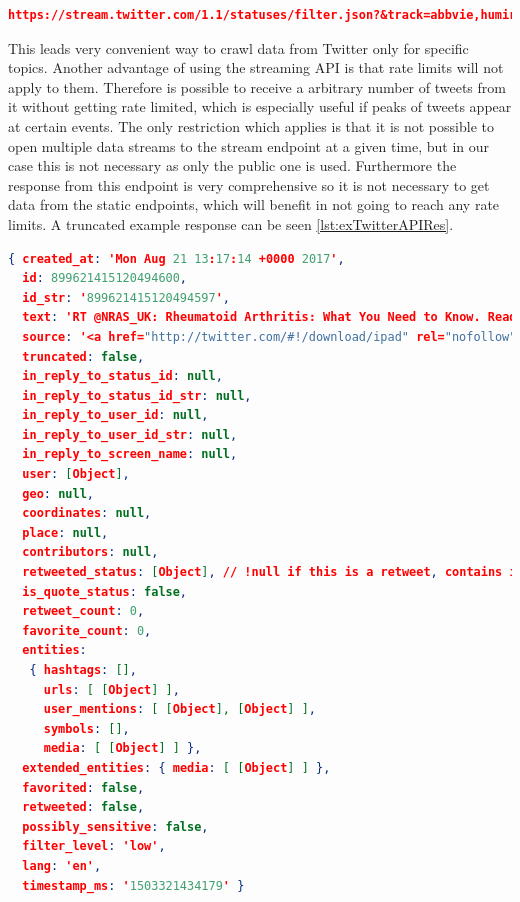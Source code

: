 \documentclass[11pt,titlepage,oneside,openany]{book}
\begin{document}
\begin{lstlisting}[caption={Twitter streaming endpoint},captionpos=b,language=json,label={lst:twitterStreaming}]
https://stream.twitter.com/1.1/statuses/filter.json?&track=abbvie,humira,adalimumab...
\end{lstlisting}

This leads very convenient way to crawl data from Twitter only for specific topics. Another advantage of using the streaming API is that rate limits will not apply to them. Therefore is possible to receive a arbitrary number of tweets from it without getting rate limited, which is especially useful if peaks of tweets appear at certain events. The only restriction which applies is that it is not possible to open multiple data streams to the stream endpoint at a given time, but in our case this is not necessary as only the public one is used.
Furthermore the response from this endpoint is very comprehensive so it is not necessary to get data from the static endpoints, which will benefit in not going to reach any rate limits. A truncated example response can be seen \autoref{lst:exTwitterAPIRes}.


\begin{lstlisting}[caption={Example Twitter API response},captionpos=b,language=json,label={lst:exTwitterAPIRes}]
{ created_at: 'Mon Aug 21 13:17:14 +0000 2017',
  id: 899621415120494600,
  id_str: '899621415120494597',
  text: 'RT @NRAS_UK: Rheumatoid Arthritis: What You Need to Know. Read article by @Treated_com here: https://t.co/Z036Mzepee https://t.co/bIh4kREAIi',
  source: '<a href="http://twitter.com/#!/download/ipad" rel="nofollow">Twitter for iPad</a>',
  truncated: false,
  in_reply_to_status_id: null,
  in_reply_to_status_id_str: null,
  in_reply_to_user_id: null,
  in_reply_to_user_id_str: null,
  in_reply_to_screen_name: null,
  user: [Object],
  geo: null,
  coordinates: null,
  place: null,
  contributors: null,
  retweeted_status: [Object], // !null if this is a retweet, contains information about original tweet
  is_quote_status: false,
  retweet_count: 0,
  favorite_count: 0,
  entities:
   { hashtags: [],
     urls: [ [Object] ],
     user_mentions: [ [Object], [Object] ],
     symbols: [],
     media: [ [Object] ] },
  extended_entities: { media: [ [Object] ] },
  favorited: false,
  retweeted: false,
  possibly_sensitive: false,
  filter_level: 'low',
  lang: 'en',
  timestamp_ms: '1503321434179' }
\end{lstlisting}
\end{document}

